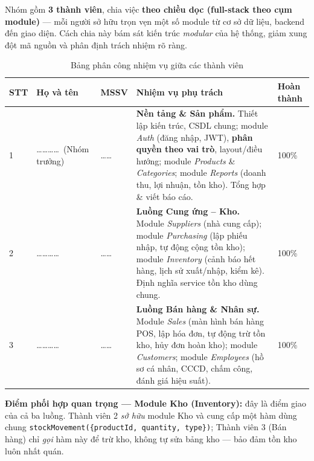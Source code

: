 \documentclass[12pt,a4paper]{report}
\begin{document}
Nhóm gồm \textbf{3 thành viên}, chia việc \textbf{theo chiều dọc (full-stack theo cụm module)} --- mỗi người sở hữu trọn vẹn một số module từ cơ sở dữ liệu, backend đến giao diện. Cách chia này bám sát kiến trúc \emph{modular} của hệ thống, giảm xung đột mã nguồn và phân định trách nhiệm rõ ràng.

\renewcommand{\arraystretch}{1.4}
\begin{table}[H]
\centering
\small
\begin{tabularx}{\textwidth}{|C{0.9cm}|L{3.3cm}|L{2.2cm}|X|C{1.6cm}|}
\hline
\textbf{STT} & \textbf{Họ và tên} & \textbf{MSSV} & \textbf{Nhiệm vụ phụ trách} & \textbf{Hoàn thành} \\  & \ldots\ldots\ldots\ldots\ \allowbreak(Nhóm trưởng) & \ldots\ldots &
\textbf{Nền tảng \& Sản phẩm.} Thiết lập kiến trúc, CSDL chung; module \textit{Auth} (đăng nhập, JWT), \textbf{phân quyền theo vai trò}, layout/điều hướng; module \textit{Products} \& \textit{Categories}; module \textit{Reports} (doanh thu, lợi nhuận, tồn kho). Tổng hợp \& viết báo cáo. & 100\% \\  & \ldots\ldots\ldots\ldots & \ldots\ldots &
\textbf{Luồng Cung ứng -- Kho.} Module \textit{Suppliers} (nhà cung cấp); module \textit{Purchasing} (lập phiếu nhập, tự động cộng tồn kho); module \textit{Inventory} (cảnh báo hết hàng, lịch sử xuất/nhập, kiểm kê). Định nghĩa service tồn kho dùng chung. & 100\% \\  & \ldots\ldots\ldots\ldots & \ldots\ldots &
\textbf{Luồng Bán hàng \& Nhân sự.} Module \textit{Sales} (màn hình bán hàng POS, lập hóa đơn, tự động trừ tồn kho, hủy đơn hoàn kho); module \textit{Customers}; module \textit{Employees} (hồ sơ cá nhân, CCCD, chấm công, đánh giá hiệu suất). & 100\% \\ \hline
\end{tabularx}
\caption{Bảng phân công nhiệm vụ giữa các thành viên}
\end{table}
\renewcommand{\arraystretch}{1.0}

\noindent\textbf{Điểm phối hợp quan trọng --- Module Kho (Inventory):} đây là điểm giao của cả ba luồng. Thành viên 2 \emph{sở hữu} module Kho và cung cấp một hàm dùng chung \texttt{stockMovement(\{productId, quantity, type\})}; Thành viên 3 (Bán hàng) chỉ \emph{gọi} hàm này để trừ kho, không tự sửa bảng kho --- bảo đảm tồn kho luôn nhất quán.

\tableofcontents
\thispagestyle{fancy}
\end{document}
